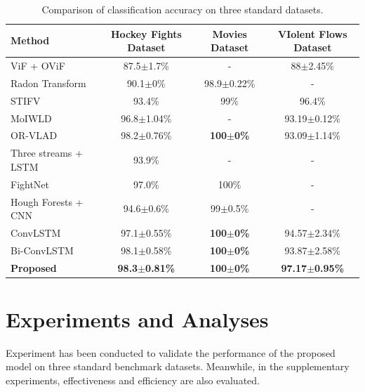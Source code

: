 \documentclass[10pt,twocolumn,letterpaper]{article}
\begin{document}

\begin{table}[t]
\begin{center}
\caption{Comparison of classification accuracy on three standard datasets.}
\label{table:result}
\begin{tabular}{lccc}
\hline
\textbf{Method} & \textbf{Hockey Fights Dataset} & \textbf{Movies Dataset} & \textbf{VIolent Flows Dataset} \\
\hline\hline
ViF + OViF \cite{ovif} & 87.5$\pm$1.7\% & - & 88$\pm$2.45\% \\
Radon Transform \cite{fast} & 90.1$\pm$0\% & 98.9$\pm$0.22\% & - \\
STIFV \cite{bilinski2016human} & 93.4\% & 99\% & 96.4\% \\
MoIWLD \cite{MoIWLD} & 96.8$\pm$1.04\% & - & 93.19$\pm$0.12\% \\
OR-VLAD \cite{vlad} & 98.2$\pm$0.76\% & \textbf{100$\pm$0\%} & 93.09$\pm$1.14\% \\
\hline
Three streams + LSTM \cite{dong2016multi} & 93.9\% & - & - \\
FightNet \cite{zhou2017violent} & 97.0\% & 100\% & - \\
Hough Forests + CNN \cite{serrano2018fight} & 94.6$\pm$0.6\% & 99$\pm$0.5\% & - \\
ConvLSTM \cite{convlstm_sudh} & 97.1$\pm$0.55\% & \textbf{100$\pm$0\%} & 94.57$\pm$2.34\% \\
Bi-ConvLSTM \cite{bi_convlstm} & 98.1$\pm$0.58\% & \textbf{100$\pm$0\%} & 93.87$\pm$2.58\% \\
\textbf{Proposed} & \textbf{98.3$\pm$0.81\%} & \textbf{100$\pm$0\%} & \textbf{97.17$\pm$0.95\%} \\
\hline
\end{tabular}
\end{center}
\end{table}


\section{Experiments and Analyses}
\label{sec:4}

Experiment has been conducted to validate the performance of the proposed model on three standard benchmark datasets.
Meanwhile, in the supplementary experiments, effectiveness and efficiency are also evaluated.
\end{document}
